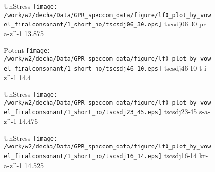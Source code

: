 \documentclass{article}
\begin{document}
\begin{figure}[t]
\begin{minipage}[b]{.24\textwidth}
UnStress
\centering
\texttt{[image: /work/w2/decha/Data/GPR\_speccom\_data/figure/lf0\_plot\_by\_vowel\_finalconsonant/1\_short\_no/tscsdj06\_30.eps]}
tscsdj06-30 pr-a-z\textasciicircum-1 13.875
\end{minipage}
\begin{minipage}[b]{.24\textwidth}
\colorbox{Apricot}{Potent}
\centering
\texttt{[image: /work/w2/decha/Data/GPR\_speccom\_data/figure/lf0\_plot\_by\_vowel\_finalconsonant/1\_short\_no/tscsdj46\_10.eps]}
tscsdj46-10 t-i-z\textasciicircum-1 14.4
\end{minipage}
\begin{minipage}[b]{.24\textwidth}
UnStress
\centering
\texttt{[image: /work/w2/decha/Data/GPR\_speccom\_data/figure/lf0\_plot\_by\_vowel\_finalconsonant/1\_short\_no/tscsdj23\_45.eps]}
tscsdj23-45 s-a-z\textasciicircum-1 14.475
\end{minipage}
\begin{minipage}[b]{.24\textwidth}
UnStress
\centering
\texttt{[image: /work/w2/decha/Data/GPR\_speccom\_data/figure/lf0\_plot\_by\_vowel\_finalconsonant/1\_short\_no/tscsdj16\_14.eps]}
tscsdj16-14 kr-a-z\textasciicircum-1 14.525
\end{minipage}
\end{figure}
\end{document}
